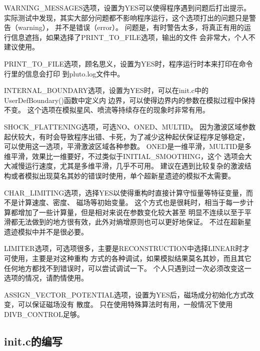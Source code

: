 WARNING\_MESSAGES选项，设置为YES可以使得程序遇到问题后打出提示。
实际测试中发现，其实大部分问题都不影响程序运行，这个选项打出的问题只是警告（warning），
并不是错误（error）。
问题是，有时警告太多，将真正有用的运行信息遮挡，如果选择了PRINT\_TO\_FILE选项，输出的文件
会非常大，个人不建议使用。

PRINT\_TO\_FILE选项，顾名思义，设置为YES时，程序运行时本来打印在命令行里的信息会打印
到pluto.log文件中。

INTERNAL\_BOUNDARY选项，设置为YES时，可以在init.c中的UserDefBoundary()函数中定义内
边界，可以使得边界内的参数在模拟过程中保持不变。
这个选项在模拟星风、喷流等持续存在的现象时非常有用。

SHOCK\_FLATTENING选项，可选NO、ONED、MULTID。
因为激波区域参数起伏较大，有时会导致程序出错、卡死，为了减少这种起伏保证程序足够稳定，
可以使用这一选项，平滑激波区域各种参数。
ONED是一维平滑，MULTID是多维平滑，效果比一维要好，不过类似于INITIAL\_SMOOTHING，这个
选项会大大减慢运行速度，尤其是多维平滑，几乎不可用。
建议在遇到比较复杂的激波结构或者模拟出现莫名其妙的错误时使用，单个超新星遗迹的模拟不太需要。

CHAR\_LIMITING选项，选择YES以使得重构时直接计算守恒量等特征变量，而不是计算速度、密度、
磁场等初始变量。
这个方式也是很耗时，相当于每一步计算都增加了一些计算量，但是相对来说在参数变化较大甚至
明显不连续以至于平滑都无法做到的地方很有效，此外对熵增原则也可以更好地保证。
不过在超新星遗迹模拟中并不是很必要。

LIMITER选项，可选项很多，主要是RECONSTRUCTION中选择LINEAR时才可使用，主要是对这种重构
方式的各种调试，如果模拟结果莫名其妙，而且其它任何地方都找不到错误时，可以尝试调试一下。
个人只遇到过一次必须改变这一选项的情况，请酌情使用。

ASSIGN\_VECTOR\_POTENTIAL选项，设置为YES后，磁场成分初始化方式改变，可以保证磁场没有
散度。
只在使用特殊算法时有用，一般情况下使用DIVB\_CONTROL足够。

\subsection{init.c的编写}
